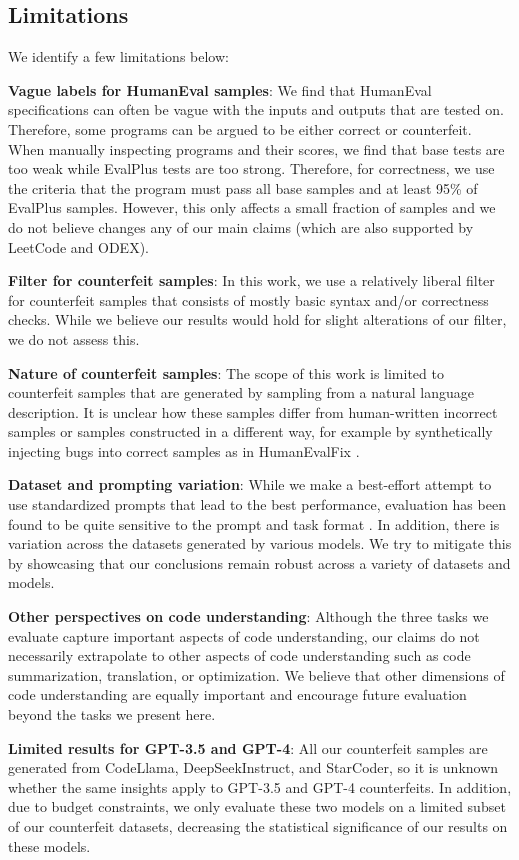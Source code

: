 \subsection{Limitations}
We identify a few limitations below:

\textbf{Vague labels for HumanEval samples}: We find that HumanEval specifications can often be vague with the inputs and outputs that are tested on. Therefore, some programs can be argued to be either correct or counterfeit. When manually inspecting programs and their scores, we find that base tests are too weak while EvalPlus tests are too strong. Therefore, for correctness, we use the criteria that the program must pass all base samples and at least 95\% of EvalPlus samples. However, this only affects a small fraction of samples and we do not believe changes any of our main claims (which are also supported by LeetCode and ODEX). 

\textbf{Filter for counterfeit samples}: In this work, we use a relatively liberal filter for counterfeit samples that consists of mostly basic syntax and/or correctness checks. While we believe our results would hold for slight alterations of our filter, we do not assess this.

\textbf{Nature of counterfeit samples}: The scope of this work is limited to counterfeit samples that are generated by sampling from a natural language description. It is unclear how these samples differ from human-written incorrect samples or samples constructed in a different way, for example by synthetically injecting bugs into correct samples as in HumanEvalFix \citep{muennighoff2023octopack}.

\textbf{Dataset and prompting variation}: While we make a best-effort attempt to use standardized prompts that lead to the best performance, evaluation has been found to be quite sensitive to the prompt and task format \citep{mizrahi2023state}. In addition, there is variation across the datasets generated by various models. We try to mitigate this by showcasing that our conclusions remain robust across a variety of datasets and models. 

\textbf{Other perspectives on code understanding}: Although the three tasks we evaluate capture important aspects of code understanding, our claims do not necessarily extrapolate to other aspects of code understanding such as code summarization, translation, or optimization. We believe that other dimensions of code understanding are equally important and encourage future evaluation beyond the tasks we present here.

\textbf{Limited results for GPT-3.5 and GPT-4}: All our counterfeit samples are generated from CodeLlama, DeepSeekInstruct, and StarCoder, so it is unknown whether the same insights apply to GPT-3.5 and GPT-4 counterfeits. In addition, due to budget constraints, we only evaluate these two models on a limited subset of our counterfeit datasets, decreasing the statistical significance of our results on these models. 